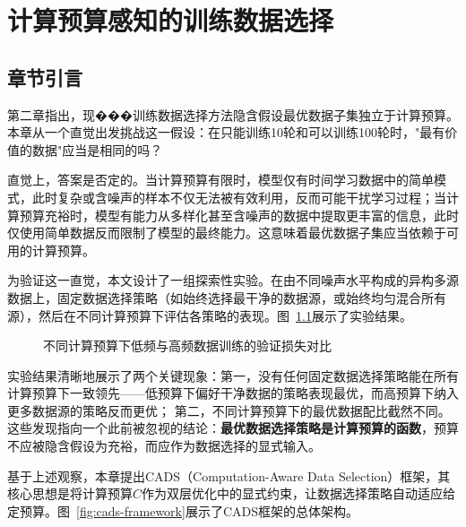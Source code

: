 \chapter{计算预算感知的训练数据选择}

\section{章节引言}

第二章指出，现���训练数据选择方法隐含假设最优数据子集独立于计算预算。本章从一个直觉出发挑战这一假设：在只能训练10轮和可以训练100轮时，"最有价值的数据"应当是相同的吗？

直觉上，答案是否定的。当计算预算有限时，模型仅有时间学习数据中的简单模式\cite{rahaman2018spectral}，此时复杂或含噪声的样本不仅无法被有效利用，反而可能干扰学习过程；当计算预算充裕时，模型有能力从多样化甚至含噪声的数据中提取更丰富的信息，此时仅使用简单数据反而限制了模型的最终能力。这意味着最优数据子集应当依赖于可用的计算预算。

为验证这一直觉，本文设计了一组探索性实验。在由不同噪声水平构成的异构多源数据上，固定数据选择策略（如始终选择最干净的数据源，或始终均匀混合所有源），然后在不同计算预算下评估各策略的表现。图~\ref{fig:cads-exploratory}展示了实验结果。%

\begin{figure}[htb]
  \centering
  \caption{不同计算预算下低频与高频数据训练的验证损失对比}
  \label{fig:cads-exploratory}
\end{figure}

实验结果清晰地展示了两个关键现象：第一，没有任何固定数据选择策略能在所有计算预算下一致领先——低预算下偏好干净数据的策略表现最优，而高预算下纳入更多数据源的策略反而更优；%
第二，不同计算预算下的最优数据配比截然不同。这些发现指向一个此前被忽视的结论：\textbf{最优数据选择策略是计算预算的函数}，预算不应被隐含假设为充裕，而应作为数据选择的显式输入。

基于上述观察，本章提出CADS（Computation-Aware Data Selection）框架，其核心思想是将计算预算$C$作为双层优化中的显式约束，让数据选择策略自动适应给定预算。图~\ref{fig:cads-framework}展示了CADS框架的总体架构。

